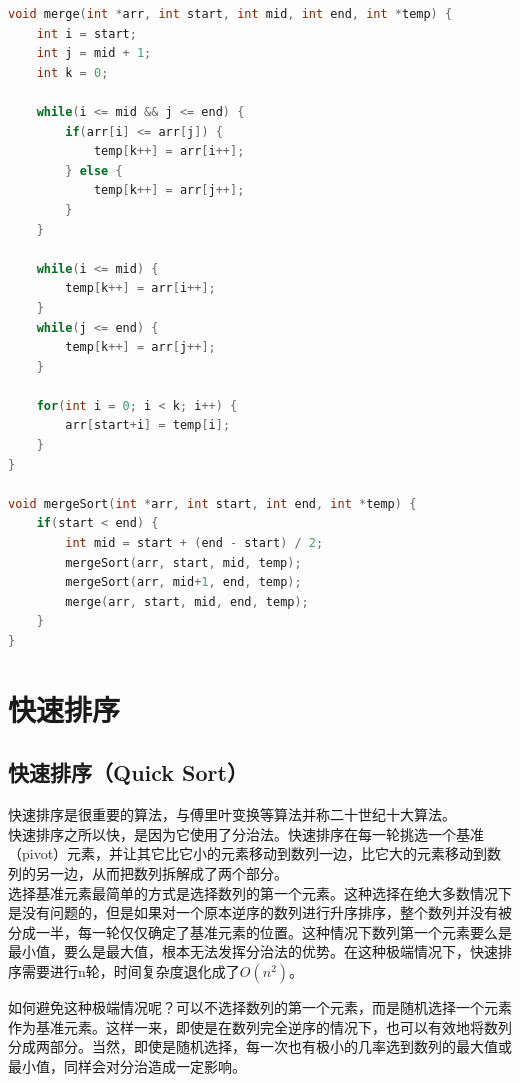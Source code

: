 \begin{lstlisting}[language=C]
void merge(int *arr, int start, int mid, int end, int *temp) {
    int i = start;
    int j = mid + 1;
    int k = 0;

    while(i <= mid && j <= end) {
        if(arr[i] <= arr[j]) {
            temp[k++] = arr[i++];
        } else {
            temp[k++] = arr[j++];
        }
    }

    while(i <= mid) {
        temp[k++] = arr[i++];
    }
    while(j <= end) {
        temp[k++] = arr[j++];
    }

    for(int i = 0; i < k; i++) {
        arr[start+i] = temp[i];
    }
}

void mergeSort(int *arr, int start, int end, int *temp) {
    if(start < end) {
        int mid = start + (end - start) / 2;
        mergeSort(arr, start, mid, temp);
        mergeSort(arr, mid+1, end, temp);
        merge(arr, start, mid, end, temp);
    }
}
\end{lstlisting}

\newpage

\section{快速排序}

\subsection{快速排序（Quick Sort）}

快速排序是很重要的算法，与傅里叶变换等算法并称二十世纪十大算法。 \\

快速排序之所以快，是因为它使用了分治法。快速排序在每一轮挑选一个基准（pivot）元素，并让其它比它小的元素移动到数列一边，比它大的元素移动到数列的另一边，从而把数列拆解成了两个部分。 \\

选择基准元素最简单的方式是选择数列的第一个元素。这种选择在绝大多数情况下是没有问题的，但是如果对一个原本逆序的数列进行升序排序，整个数列并没有被分成一半，每一轮仅仅确定了基准元素的位置。这种情况下数列第一个元素要么是最小值，要么是最大值，根本无法发挥分治法的优势。在这种极端情况下，快速排序需要进行n轮，时间复杂度退化成了$ O(n^2) $。

如何避免这种极端情况呢？可以不选择数列的第一个元素，而是随机选择一个元素作为基准元素。这样一来，即使是在数列完全逆序的情况下，也可以有效地将数列分成两部分。当然，即使是随机选择，每一次也有极小的几率选到数列的最大值或最小值，同样会对分治造成一定影响。 \\

